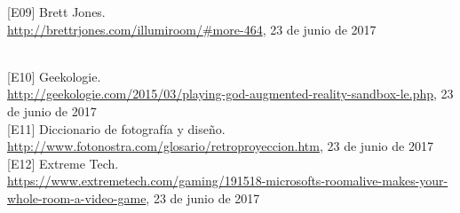 \documentclass[a4paper,openright,12pt]{report}
\begin{document}
\hypertarget{e09}{[E09] Brett Jones.\\ \url{http://brettrjones.com/illumiroom/\#more-464}, 23 de junio de 2017}\\

\hypertarget{e10}{[E10] Geekologie.\\ \url{http://geekologie.com/2015/03/playing-god-augmented-reality-sandbox-le.php}, 23 de junio de 2017}\\

\hypertarget{e11}{[E11] Diccionario de fotografía y diseño.\\ \url{http://www.fotonostra.com/glosario/retroproyeccion.htm}, 23 de junio de 2017}\\

\hypertarget{e12}{[E12] Extreme Tech.\\ \url{https://www.extremetech.com/gaming/191518-microsofts-roomalive-makes-your-whole-room-a-video-game}, 23 de junio de 2017}\\
\end{document}
